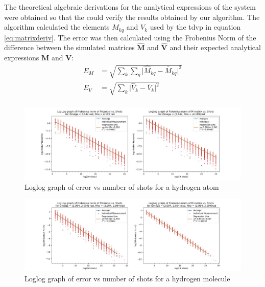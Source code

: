 \documentclass{aux/ttuthes2007}
\begin{document}
The theoretical algebraic derivations for the analytical expressions of the system were obtained so that the could verify the results obtained by our algorithm.
The algorithm calculated the elements $M_{kq}$ and $V_k$ used by the \gls{tdvp} in equation \ref{eq:matrixderiv}. The error was then calculated using the Frobenius Norm of the difference between the simulated matrices $\hat {\bm M}$ and $\hat {\bm V}$ and their expected analytical expressions $\bm {\bar M}$ and $\bm {\bar V}$:
%
\begin{equation*}
	\begin{split}
		E_M &= \sqrt{\sum_k \sum_q \lvert {\hat M_{kq} - \bar M_{kq}} \rvert ^ 2 }\\
		E_V &= \sqrt{\sum_k \lvert {\hat V_{k} - \bar V_{k}} \rvert ^ 2 }\\
	\end{split}
\end{equation*}
%
\begin{figure}[h!]
	\includegraphics[width=\linewidth]{img/1e.jpg}
  \caption{Loglog graph of error vs number of shots for a hydrogen atom}
  \label{fig:1derrorgraph}
\end{figure}

\begin{figure}[h!]
	\includegraphics[width=\linewidth]{img/2e-nonint.jpg}
  \caption{Loglog graph of error vs number of shots for a hydrogen molecule}
  \label{fig:2derrorgraph}
\end{figure}
\end{document}
